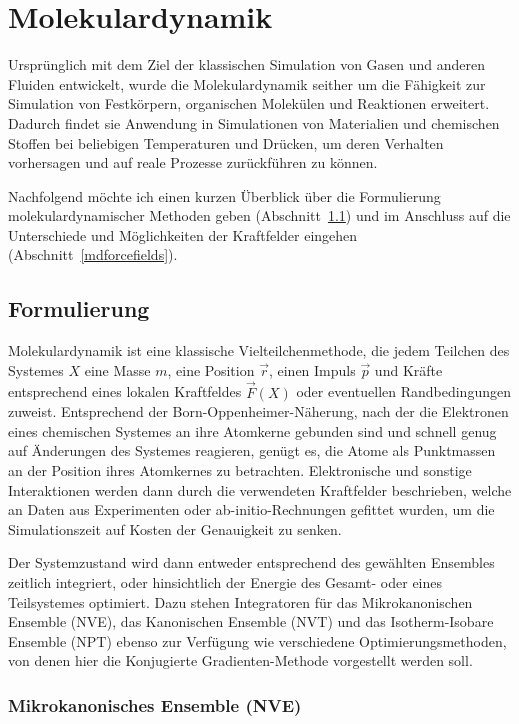 \section{Molekulardynamik}
\label{md}

Ursprünglich mit dem Ziel der klassischen Simulation von Gasen und anderen Fluiden entwickelt, wurde die Molekulardynamik\cite{hoover_molecular_1986} seither um die Fähigkeit zur Simulation von Festkörpern, organischen Molekülen und Reaktionen erweitert.
Dadurch findet sie Anwendung in Simulationen von Materialien und chemischen Stoffen bei beliebigen Temperaturen und Drücken, um deren Verhalten vorhersagen und auf reale Prozesse zurückführen zu können.

Nachfolgend möchte ich einen kurzen Überblick über die Formulierung molekulardynamischer Methoden geben (Abschnitt~\ref{mdformulation}) und im Anschluss auf die Unterschiede und Möglichkeiten der Kraftfelder eingehen (Abschnitt~\ref{mdforcefields}).

\subsection{Formulierung}
\label{mdformulation}

Molekulardynamik ist eine klassische Vielteilchenmethode, die jedem Teilchen des Systemes $X$ eine Masse $m$, eine Position $\vec r$, einen Impuls $\vec p$ und Kräfte entsprechend eines lokalen Kraftfeldes $\vec{F}(X)$ oder eventuellen Randbedingungen zuweist.
Entsprechend der Born-Oppenheimer-Näherung, nach der die Elektronen eines chemischen Systemes an ihre Atomkerne gebunden sind und schnell genug auf Änderungen des Systemes reagieren, genügt es, die Atome als Punktmassen an der Position ihres Atomkernes zu betrachten.
Elektronische und sonstige Interaktionen werden dann durch die verwendeten Kraftfelder beschrieben, welche an Daten aus Experimenten oder ab-initio-Rechnungen gefittet wurden, um die Simulationszeit auf Kosten der Genauigkeit zu senken.

Der Systemzustand wird dann entweder entsprechend des gewählten Ensembles zeitlich integriert, oder hinsichtlich der Energie des Gesamt- oder eines Teilsystemes optimiert.
Dazu stehen Integratoren für das Mikrokanonischen Ensemble (NVE), das Kanonischen Ensemble (NVT) und das Isotherm-Isobare Ensemble (NPT) ebenso zur Verfügung wie verschiedene Optimierungsmethoden, von denen hier die Konjugierte Gradienten-Methode vorgestellt werden soll.

\subsubsection{Mikrokanonisches Ensemble (NVE)}

